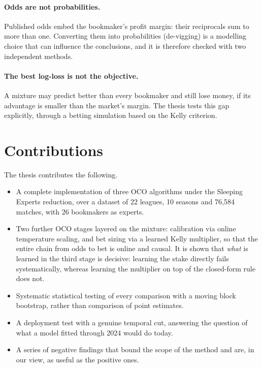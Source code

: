 \documentclass[12pt,a4paper,oneside]{report}
\renewcommand{\_}{\oldunderscore\allowbreak}
\theoremstyle{definition}
\theoremstyle{plain}
\theoremstyle{remark}
\begin{document}
\paragraph{Odds are not probabilities.} Published odds embed the bookmaker's profit margin:
their reciprocals sum to more than one. Converting them into probabilities (de-vigging) is a
modelling choice that can influence the conclusions, and it is therefore checked with two
independent methods.

\paragraph{The best log-loss is not the objective.} A mixture may predict better than every
bookmaker and still lose money, if its advantage is smaller than the market's margin. The
thesis tests this gap explicitly, through a betting simulation based on the Kelly criterion.

\section{Contributions}

The thesis contributes the following.

\begin{itemize}
  \item A complete implementation of three OCO algorithms under the Sleeping Experts
        reduction, over a dataset of 22 leagues, 10 seasons and 76,584 matches, with 26
        bookmakers as experts.
  \item Two further OCO stages layered on the mixture: calibration via online temperature
        scaling, and bet sizing via a learned Kelly multiplier, so that the entire chain from
        odds to bet is online and causal. It is shown that \emph{what} is learned in the third
        stage is decisive: learning the stake directly fails systematically, whereas learning
        the multiplier on top of the closed-form rule does not.
  \item Systematic statistical testing of every comparison with a moving block bootstrap,
        rather than comparison of point estimates.
  \item A deployment test with a genuine temporal cut, answering the question of what a model
        fitted through 2024 would do today.
  \item A series of negative findings that bound the scope of the method and are, in our view,
        as useful as the positive ones.
\end{itemize}
\end{document}
